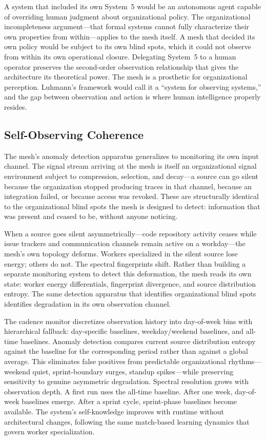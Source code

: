 \documentclass[11pt,a4paper]{article}
\begin{document}
A system that included its own System~5 would be an autonomous agent capable of overriding human judgment about organizational policy. The organizational incompleteness argument---that formal systems cannot fully characterize their own properties from within---applies to the mesh itself. A mesh that decided its own policy would be subject to its own blind spots, which it could not observe from within its own operational closure. Delegating System~5 to a human operator preserves the second-order observation relationship that gives the architecture its theoretical power. The mesh is a prosthetic for organizational perception. Luhmann's framework would call it a ``system for observing systems,'' and the gap between observation and action is where human intelligence properly resides.


\subsection{Self-Observing Coherence}
\label{sec:cadence}

The mesh's anomaly detection apparatus generalizes to monitoring its own input channel. The signal stream arriving at the mesh is itself an organizational signal environment subject to compression, selection, and decay---a source can go silent because the organization stopped producing traces in that channel, because an integration failed, or because access was revoked. These are structurally identical to the organizational blind spots the mesh is designed to detect: information that was present and ceased to be, without anyone noticing.

When a source goes silent asymmetrically---code repository activity ceases while issue trackers and communication channels remain active on a workday---the mesh's own topology deforms. Workers specialized in the silent source lose energy; others do not. The spectral fingerprints shift. Rather than building a separate monitoring system to detect this deformation, the mesh reads its own state: worker energy differentials, fingerprint divergence, and source distribution entropy. The same detection apparatus that identifies organizational blind spots identifies degradation in its own observation channel.

The cadence monitor discretizes observation history into day-of-week bins with hierarchical fallback: day-specific baselines, weekday/weekend baselines, and all-time baselines. Anomaly detection compares current source distribution entropy against the baseline for the corresponding period rather than against a global average. This eliminates false positives from predictable organizational rhythms---weekend quiet, sprint-boundary surges, standup spikes---while preserving sensitivity to genuine asymmetric degradation. Spectral resolution grows with observation depth. A first run uses the all-time baseline. After one week, day-of-week baselines emerge. After a sprint cycle, sprint-phase baselines become available. The system's self-knowledge improves with runtime without architectural changes, following the same match-based learning dynamics that govern worker specialization.
\end{document}
